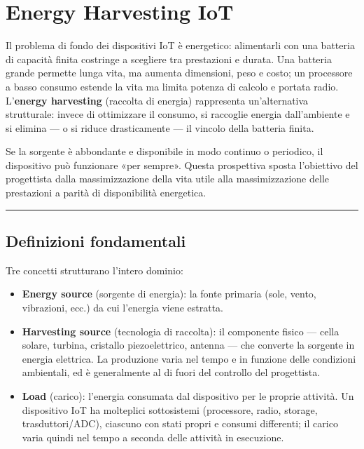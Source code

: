 \documentclass[
  italian,
  openany]{book}
\providecommand{\tightlist}{%
  \setlength{\itemsep}{0pt}\setlength{\parskip}{0pt}}
\begin{document}
\newpage

\chapter{Energy Harvesting IoT}\label{energy-harvesting-iot}

Il problema di fondo dei dispositivi IoT è energetico: alimentarli con
una batteria di capacità finita costringe a scegliere tra prestazioni e
durata. Una batteria grande permette lunga vita, ma aumenta dimensioni,
peso e costo; un processore a basso consumo estende la vita ma limita
potenza di calcolo e portata radio. L'\textbf{energy harvesting}
(raccolta di energia) rappresenta un'alternativa strutturale: invece di
ottimizzare il consumo, si raccoglie energia dall'ambiente e si elimina
--- o si riduce drasticamente --- il vincolo della batteria finita.

Se la sorgente è abbondante e disponibile in modo continuo o periodico,
il dispositivo può funzionare «per sempre». Questa prospettiva sposta
l'obiettivo del progettista dalla massimizzazione della vita utile alla
massimizzazione delle prestazioni a parità di disponibilità energetica.

\begin{center}\rule{0.5\linewidth}{0.5pt}\end{center}

\section{Definizioni fondamentali}\label{definizioni-fondamentali}

Tre concetti strutturano l'intero dominio:

\begin{itemize}
\tightlist
\item
  \textbf{Energy source} (sorgente di energia): la fonte primaria (sole,
  vento, vibrazioni, ecc.) da cui l'energia viene estratta.
\item
  \textbf{Harvesting source} (tecnologia di raccolta): il componente
  fisico --- cella solare, turbina, cristallo piezoelettrico, antenna
  --- che converte la sorgente in energia elettrica. La produzione varia
  nel tempo e in funzione delle condizioni ambientali, ed è generalmente
  al di fuori del controllo del progettista.
\item
  \textbf{Load} (carico): l'energia consumata dal dispositivo per le
  proprie attività. Un dispositivo IoT ha molteplici sottosistemi
  (processore, radio, storage, trasduttori/ADC), ciascuno con stati
  propri e consumi differenti; il carico varia quindi nel tempo a
  seconda delle attività in esecuzione.
\end{itemize}
\end{document}
